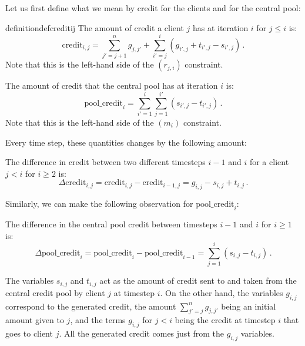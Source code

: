 Let us first define what we mean by credit for the clients and for the central pool:
\begin{restatable}{definition}{defcreditij}\label{def:credit-ij}
    The amount of credit a client $j$ has at iteration $i$ for $j \leq i$ is:
    \begin{equation*}
        \text{credit}_{i,j} = \sum_{j'=j+1}^n g_{j,j'} + \sum_{i' = j}^{i} \left(g_{i',j} + t_{i',j} - s_{i',j}\right)\,.
    \end{equation*}
    Note that this is the left-hand side of the $(r_{j,i})$ constraint.
\end{restatable}
\begin{definition}\label{def:pool-credit}
    The amount of credit that the central pool has at iteration $i$ is:
    \begin{equation*}
        \text{pool\_credit}_i = \sum_{i'=1}^i \sum_{j=1}^{i'} \left(s_{i',j} - t_{i',j}\right)\,.
    \end{equation*}
    Note that this is the left-hand side of the $(m_i)$ constraint.
\end{definition}  
Every time step, these quantities changes by the following amount:
\begin{observation}
    The difference in credit between two different timesteps $i-1$ and $i$ for a client $j<i$ for $i \geq 2$ is:
    \begin{equation*}
        \Delta \text{credit}_{i,j} = \text{credit}_{i,j} - \text{credit}_{i-1,j} = g_{i,j} - s_{i,j} + t_{i,j}\,.
    \end{equation*}
\end{observation}
Similarly, we can make the following observation for $\text{pool\_credit}_i$:
\begin{observation}
    The difference in the central pool credit between timesteps $i-1$ and $i$ for $i \geq 1$ is:
    \begin{equation*}
        \Delta\text{pool\_credit}_i = \text{pool\_credit}_i - \text{pool\_credit}_{i-1} = \sum_{j=1}^{i} \left(s_{i,j} - t_{i,j}\right)\,.
    \end{equation*}
\end{observation}
The variables $s_{i,j}$ and $t_{i,j}$ act as the amount of credit sent to and taken from the central credit pool by client $j$ at timestep $i$. On the other hand, the variables $g_{i,j}$ correspond to the generated credit, the amount $\sum_{j'=j}^n g_{j,j'}$ being an initial amount given to $j$, and the terms $g_{i,j}$ for $j<i$ being the credit at timestep $i$ that goes to client $j$. All the generated credit comes just from the $g_{i,j}$ variables. 

